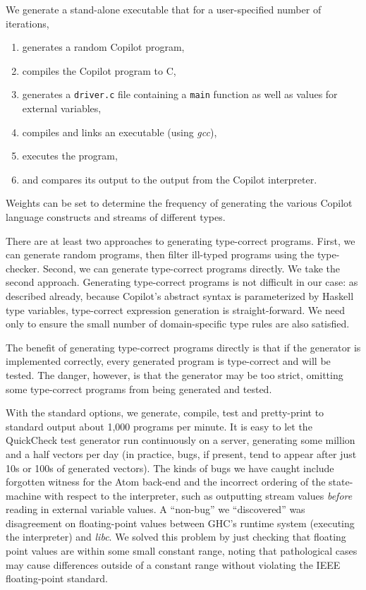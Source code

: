 \documentclass[preprint]{sigplanconf}
\begin{document}
We generate a stand-alone executable that for a user-specified number of iterations,
\begin{enumerate}
\item generates a random Copilot program,
\item compiles the Copilot program to C,
\item generates a {\tt driver.c} file containing a {\tt main} function as well
  as values for external variables,
\item compiles and links an executable (using \emph{gcc}),
\item executes the program,
\item and compares its output to the output from the Copilot interpreter.
\end{enumerate}

\noindent
Weights can be set to determine the frequency of generating the various Copilot
language constructs and streams of different types.  

There are at least two approaches to generating type-correct programs.  First,
we can generate random programs, then filter ill-typed programs using the
type-checker.  Second, we can generate type-correct programs directly.  We take
the second approach.  Generating type-correct programs is not difficult in our
case: as described already, because Copilot's abstract syntax is parameterized
by Haskell type variables, type-correct expression generation is
straight-forward.  We need only to ensure the small number of domain-specific
type rules are also satisfied.

The benefit of generating type-correct programs directly is that if the
generator is implemented correctly, every generated program is type-correct and
will be tested.  The danger, however, is that the generator may be too strict,
omitting some type-correct programs from being generated and tested.

With the standard options, we generate, compile, test and pretty-print to
standard output about 1,000 programs per minute.  It is easy to let the
QuickCheck test generator run continuously on a server, generating some million
and a half vectors per day (in practice, bugs, if present, tend to appear after
just 10s or 100s of generated vectors).  The kinds of bugs we have caught
include forgotten witness for the Atom back-end and the incorrect ordering of
the state-machine with respect to the interpreter, such as outputting stream
values \emph{before} reading in external variable values.  A ``non-bug'' we
``discovered'' was disagreement on floating-point values between GHC's runtime
system (executing the interpreter) and \emph{libc}.  We solved this problem by
just checking that floating point values are within some small constant range,
noting that pathological cases may cause differences outside of a constant range
without violating the IEEE floating-point standard.
\end{document}
